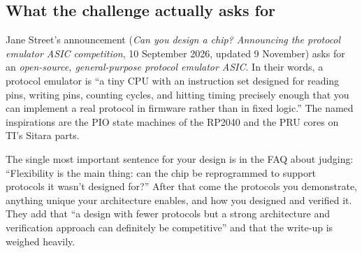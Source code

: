 

\subsection{What the challenge actually asks for}\label{sec:challenge}

Jane Street's announcement (\emph{Can you design a chip? Announcing the
protocol emulator ASIC competition}, 10 September 2026, updated
9 November) asks for an \emph{open-source, general-purpose protocol emulator
ASIC}. In their words, a protocol emulator is ``a tiny CPU with an
instruction set designed for reading pins, writing pins, counting cycles,
and hitting timing precisely enough that you can implement a real protocol
in firmware rather than in fixed logic.'' The named inspirations are the PIO
state machines of the RP2040 and the PRU cores on TI's Sitara parts.

The single most important sentence for your design is in the FAQ about
judging: ``Flexibility is the main thing: can the chip be reprogrammed to
support protocols it wasn't designed for?'' After that come the protocols you
demonstrate, anything unique your architecture enables, and how you designed
and verified it. They add that ``a design with fewer protocols but a strong
architecture and verification approach can definitely be competitive'' and
that the write-up is weighed heavily.

